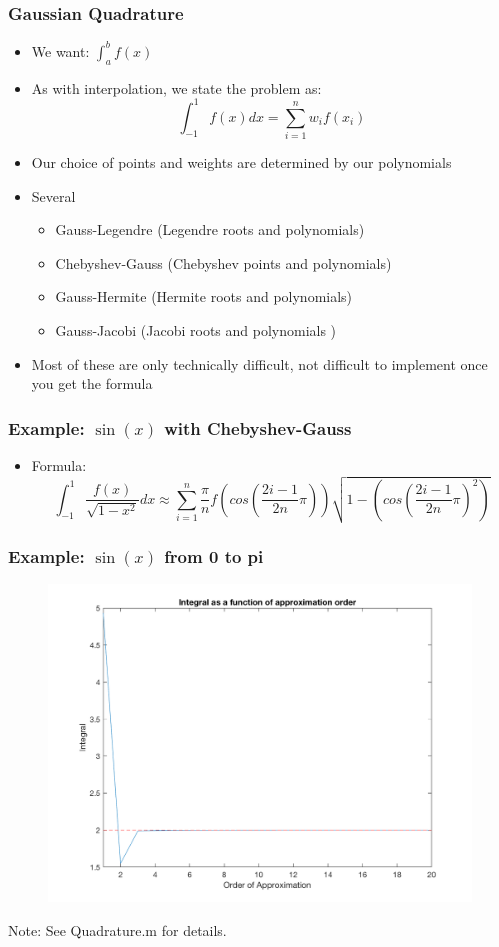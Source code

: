 \documentclass{beamer}
\begin{document}
\begin{frame}
\frametitle[alignment=center]{Gaussian Quadrature}
\begin{itemize}
\item We want: $\int_{a}^bf(x)$
\item As with interpolation, we state the problem as:
$$\int_{-1}^1f(x)dx=\sum_{i=1}^nw_if(x_i)$$
\item Our choice of points and weights are determined by our polynomials
\item Several  
\begin{itemize}
\item Gauss-Legendre (Legendre roots and polynomials)
\item Chebyshev-Gauss (Chebyshev points and polynomials)
\item Gauss-Hermite (Hermite roots and polynomials)
\item Gauss-Jacobi (Jacobi roots and polynomials )
\end{itemize}
\item Most of these are only technically difficult, not difficult to implement once you get the formula
\end{itemize}
\end{frame}


\begin{frame}
\frametitle[alignment=center]{Example: $\sin(x)$ with Chebyshev-Gauss}
\tiny
\begin{itemize}
\item Formula:
$$\int_{-1}^{1}\frac{f(x)}{\sqrt{1-x^2}}dx\approx \sum_{i=1}^n\frac{\pi}{n}f\left(cos\left(\frac{2i-1}{2n}\pi\right)\right)\sqrt{1-\left(cos\left(\frac{2i-1}{2n}\pi\right)^2\right)}$$
\end{itemize}
\end{frame}

\begin{frame}
\frametitle[alignment=center]{Example: $\sin(x)$ from 0 to pi}
\begin{figure}
\centering
\includegraphics[scale=0.5]{Quad_1.png}
\end{figure}
Note: See Quadrature.m for details.
\end{frame}
\end{document}
